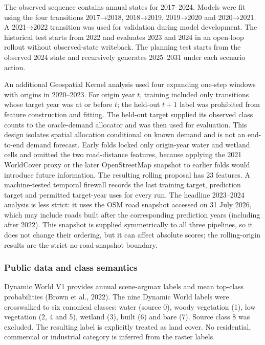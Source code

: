 \documentclass[
]{article}
\begin{document}
The observed sequence contains annual states for 2017--2024. Models were
fit using the four transitions 2017→2018, 2018→2019, 2019→2020 and
2020→2021. A 2021→2022 transition was used for validation during model
development. The historical test starts from 2022 and evaluates 2023 and
2024 in an open-loop rollout without observed-state writeback. The
planning test starts from the observed 2024 state and recursively
generates 2025--2031 under each scenario action.

An additional Geospatial Kernel analysis used four expanding one-step
windows with origins in 2020--2023. For origin year \(t\), training
included only transitions whose target year was at or before \(t\); the
held-out \(t+1\) label was prohibited from feature construction and
fitting. The held-out target supplied its observed class counts to the
oracle-demand allocator and was then used for evaluation. This design
isolates spatial allocation conditional on known demand and is not an
end-to-end demand forecast. Early folds locked only origin-year water
and wetland cells and omitted the two road-distance features, because
applying the 2021 WorldCover proxy or the later OpenStreetMap snapshot
to earlier folds would introduce future information. The resulting
rolling proposal has 23 features. A machine-tested temporal firewall
records the last training target, prediction target and permitted
target-year uses for every run. The headline 2023--2024 analysis is less
strict: it uses the OSM road snapshot accessed on 31 July 2026, which
may include roads built after the corresponding prediction years
(including after 2022). This snapshot is supplied symmetrically to all
three pipelines, so it does not change their ordering, but it can affect
absolute scores; the rolling-origin results are the strict
no-road-snapshot boundary.

\subsubsection{Public data and class
semantics}\label{public-data-and-class-semantics}

Dynamic World V1 provides annual scene-argmax labels and mean top-class
probabilities (Brown et al., 2022). The nine Dynamic World labels were
crosswalked to six canonical classes: water (source 0), woody vegetation
(1), low vegetation (2, 4 and 5), wetland (3), built (6) and bare (7).
Source class 8 was excluded. The resulting label is explicitly treated
as land cover. No residential, commercial or industrial category is
inferred from the raster labels.
\end{document}
